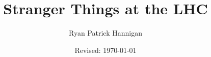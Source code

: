 \documentclass{utthesis}
\begin{document}
\author{Ryan Patrick Hannigan} 
\title{Stranger Things at the LHC}
\date{Revised: \today}

\frontmatter

\UTcopyrightlegend %

\begin{UTcommittee}
\end{UTcommittee}


\setcounter{page}{4}



% 
%

%     






\mainmatter



% 
% 
% 
% 
% 



\begin{appendix}

\end{appendix}

\backmatter

\printindex

\cleardoublepage
{}

\printbibliography
\end{document}
